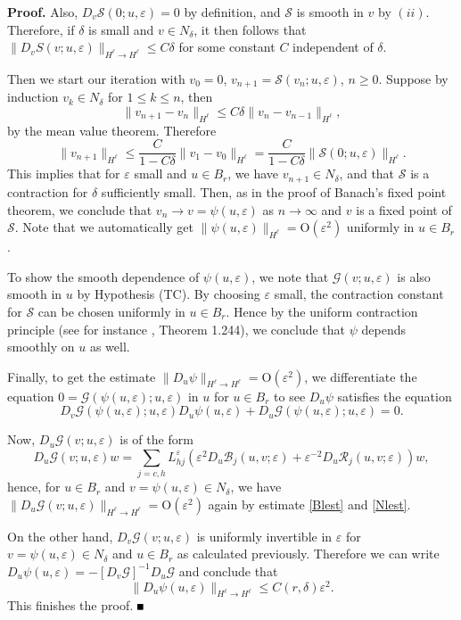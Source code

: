 \documentclass[10pt]{article}
\newenvironment{Proof}%
 {\begin{trivlist} \item[]{\bf Proof. }}%
 {\hspace*{\fill}$\rule{.4\baselineskip}{.4\baselineskip}$\end{trivlist}}
\newcommand{\rmO}{\mathrm{O}}
\newcommand{\eps}{\varepsilon}
\newcommand{\G}{\mathcal{G}}
\newcommand{\cS}{\mathcal{S}}
\newcommand{\Rm}{\mathcal{R}}
\begin{document}
\begin{Proof}
Also, $D_v\cS(0;u,\eps) = 0$ by definition, and $\cS$ is smooth in $v$ by $(ii)$. Therefore, if $\delta$ is small and $v\in N_\delta$, it then follows that $\|D_vS(v;u,\eps)\|_{H^\ell \to H^\ell} \le C\delta$ for some constant $C$ independent of $\delta$.

Then we start our iteration with $v_0 = 0$, $v_{n+1} = \cS(v_n;u,\eps)$, $n\ge 0$. Suppose by induction $v_k \in N_\delta$ for $1\le k \le n$, then
\[
\|v_{n+1}-v_n\|_{H^\ell} \le C\delta\|v_n-v_{n-1}\|_{H^\ell},
\]
by the mean value theorem. Therefore
\[
\|v_{n+1}\|_{H^\ell} \le \frac{C}{1-C\delta}\|v_1-v_0\|_{H^\ell} = \frac{C}{1-C\delta}\|\cS(0;u,\eps)\|_{H^\ell}.
\]
This implies that for $\eps$ small and $u \in B_r$, we have $v_{n+1} \in N_\delta$, and that $\cS$ is a contraction for $\delta$ sufficiently small. Then, as in the proof of Banach's fixed point theorem, we conclude that $v_n \to v = \psi(u,\eps)$ as $n\to \infty$ and $v$ is a fixed point of $\cS$. Note that we automatically get $\|\psi(u,\eps)\|_{H^\ell} = \rmO(\eps^2)$ uniformly in $u\in B_r$. 

To show the smooth dependence of $\psi(u,\eps)$, we note that $\G(v;u,\eps)$ is also smooth in $u$ by Hypothesis (TC). By choosing $\eps$ small, the contraction constant for $\cS$ can be chosen uniformly in $u \in B_r$. Hence by the uniform contraction principle (see for instance \cite{chicone2006ordinary}, Theorem 1.244), we conclude that $\psi$ depends smoothly on $u$ as well.

Finally, to get the estimate $\|D_u\psi\|_{H^\ell \to H^\ell} = \rmO(\eps^2)$, we differentiate the equation $0 = \G(\psi(u,\eps);u,\eps)$ in $u$ for $u\in B_r$ to see $D_u\psi$ satisfies the equation
\[
D_v\G(\psi(u,\eps); u,\eps)  D_u\psi(u,\eps) + D_u\G(\psi(u,\eps);u,\eps) = 0.
\]

Now, $D_u\G(v;u,\eps)$ is of the form
\[
D_u\G(v;u,\eps) w =  \sum_{j=c,h} L_{hj}^\eps (\eps^2 D_u \mathcal{B}_j(u,v;\eps) + \eps^{-2} D_u\Rm_j(u,v;\eps) ) w,
\]
hence, for $u \in B_r$ and $v=\psi(u,\eps) \in N_\delta$, we have $\|D_u\G(v;u,\eps)\|_{H^\ell \to H^\ell} = \rmO(\eps^2)$ again by estimate \eqref{Blest} and \eqref{Nlest}.

On the other hand, $D_v\G(v;u,\eps)$ is uniformly invertible in $\eps$ for $v=\psi(u,\eps)\in N_\delta$ and $u\in B_r$ as calculated previously. Therefore we can write $D_u\psi(u,\eps) = -[D_v\G]^{-1} D_u\G $ and conclude that 
\[
\|D_u\psi(u,\eps)\|_{H^\ell \to H^\ell} \le C(r,\delta)\eps^2.
\] This finishes the proof.
\end{Proof}
\end{document}
